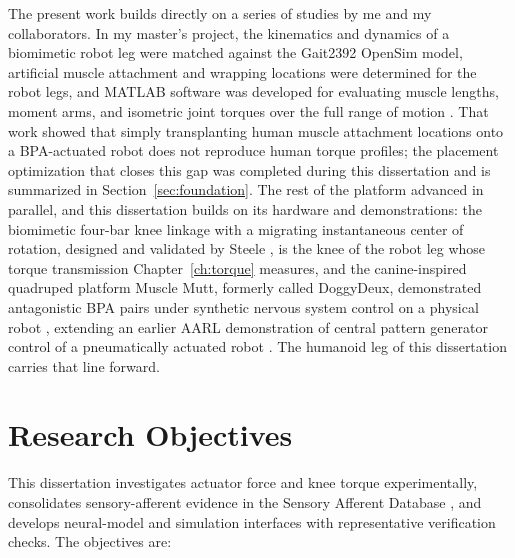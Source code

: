 The present work builds directly on a series of studies by me and my collaborators. In my master's project, the kinematics and dynamics of a biomimetic robot leg were matched against the Gait2392 OpenSim model, artificial muscle attachment and wrapping locations were determined for the robot legs, and MATLAB software was developed for evaluating muscle lengths, moment arms, and isometric joint torques over the full range of motion \citep{bolen_bipedal_2019, bolen_determination_2019}. That work showed that simply transplanting human muscle attachment locations onto a BPA-actuated robot does not reproduce human torque profiles; the placement optimization that closes this gap was completed during this dissertation and is summarized in Section~\ref{sec:foundation}. The rest of the platform advanced in parallel, and this dissertation builds on its hardware and demonstrations: the biomimetic four-bar knee linkage with a migrating instantaneous center of rotation, designed and validated by Steele \citep{steele_development_2017, steele_biomimetic_2018, steele_biomimetic_2018-1}, is the knee of the robot leg whose torque transmission Chapter~\ref{ch:torque} measures, and the canine-inspired quadruped platform Muscle Mutt, formerly called DoggyDeux, demonstrated antagonistic BPA pairs under synthetic nervous system control on a physical robot \citep{scharzenberger_design_2019}, extending an earlier AARL demonstration of central pattern generator control of a pneumatically actuated robot \citep{hunt_development_2017}. The humanoid leg of this dissertation carries that line forward.

\section{Research Objectives}\label{sec:objectives}

This dissertation investigates actuator force and knee torque experimentally, consolidates sensory-afferent evidence in the Sensory Afferent Database \citep{bolen_sensory_2023, bolen_using_2024}, and develops neural-model and simulation interfaces with representative verification checks. The objectives are:

